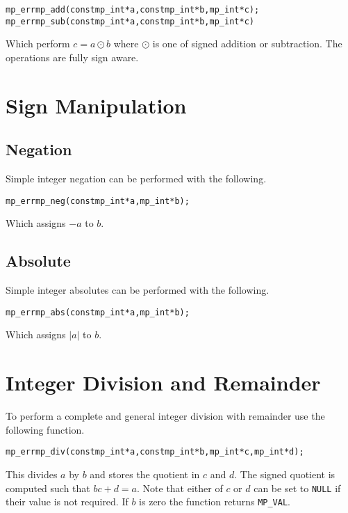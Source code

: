 \documentclass[synpaper]{book}
\begin{document}
 
\begin{alltt}
mp_err mp_add (const mp_int *a, const mp_int *b, mp_int *c);
mp_err mp_sub (const mp_int *a, const mp_int *b, mp_int *c)
\end{alltt}

Which perform $c = a \odot b$ where $\odot$ is one of signed addition or subtraction.  The
operations are fully sign aware.

\section{Sign Manipulation}
\subsection{Negation}
\label{sec:NEG}
Simple integer negation can be performed with the following.

\begin{alltt}
mp_err mp_neg (const mp_int *a, mp_int *b);
\end{alltt}

Which assigns $-a$ to $b$.

\subsection{Absolute}
Simple integer absolutes can be performed with the following.

\begin{alltt}
mp_err mp_abs (const mp_int *a, mp_int *b);
\end{alltt}

Which assigns $\vert a \vert$ to $b$.

\section{Integer Division and Remainder}
To perform a complete and general integer division with remainder use the following function.

\begin{alltt}
mp_err mp_div (const mp_int *a, const mp_int *b, mp_int *c, mp_int *d);
\end{alltt}

This divides $a$ by $b$ and stores the quotient in $c$ and $d$.  The signed quotient is computed
such that $bc + d = a$.  Note that either of $c$ or $d$ can be set to \texttt{NULL} if their value
is not required.  If $b$ is zero the function returns \texttt{MP\_VAL}.
\end{document}
